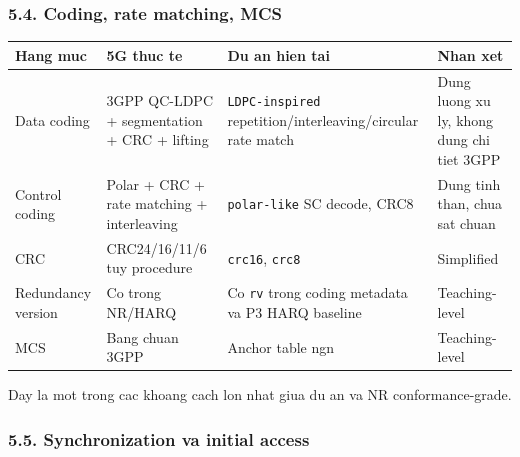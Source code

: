 \documentclass[
  vietnamese,
  a4paper,
  11pt]{article}
\newcounter{none} %
\begin{document}
\subsubsection{5.4. Coding, rate matching,
MCS}\label{coding-rate-matching-mcs}

{\def\LTcaptype{none} %
\begin{longtable}[]{@{}
  >{\raggedright\arraybackslash}p{}
  >{\raggedright\arraybackslash}p{}
  >{\raggedright\arraybackslash}p{}
  >{\raggedright\arraybackslash}p{}@{}}
\toprule\noalign{}
\begin{minipage}[b]{\linewidth}\raggedright
Hang muc
\end{minipage} & \begin{minipage}[b]{\linewidth}\raggedright
5G thuc te
\end{minipage} & \begin{minipage}[b]{\linewidth}\raggedright
Du an hien tai
\end{minipage} & \begin{minipage}[b]{\linewidth}\raggedright
Nhan xet
\end{minipage} \\
\midrule\noalign{}
\endhead
\bottomrule\noalign{}
\endlastfoot
Data coding & 3GPP QC-LDPC + segmentation + CRC + lifting &
\texttt{LDPC-inspired} repetition/interleaving/circular rate match &
Dung luong xu ly, khong dung chi tiet 3GPP \\
Control coding & Polar + CRC + rate matching + interleaving &
\texttt{polar-like} SC decode, CRC8 & Dung tinh than, chua sat chuan \\
CRC & CRC24/16/11/6 tuy procedure & \texttt{crc16}, \texttt{crc8} &
Simplified \\
Redundancy version & Co trong NR/HARQ & Co \texttt{rv} trong coding
metadata va P3 HARQ baseline & Teaching-level \\
MCS & Bang chuan 3GPP & Anchor table ngn & Teaching-level \\
\end{longtable}
}

Day la mot trong cac khoang cach lon nhat giua du an va NR
conformance-grade.

\subsubsection{5.5. Synchronization va initial
access}\label{synchronization-va-initial-access}
\end{document}
